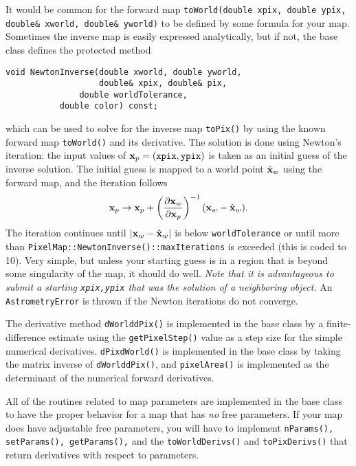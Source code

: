 \documentclass[11pt,preprint,flushrt]{aastex}
\begin{document}
It would be common for the forward map {\tt toWorld(double xpix, double ypix, double\& xworld, double\& yworld)} to be defined by some formula for your map.  Sometimes the inverse map is easily expressed analytically, but if not, the base class defines the protected method
\begin{verbatim}
void NewtonInverse(double xworld, double yworld, 
                   double& xpix, double& pix,
  	           double worldTolerance,
		   double color) const;
\end{verbatim}
which can be used to solve for the inverse map {\tt toPix()} by using the known forward map {\tt toWorld()} and its derivative.  The solution is done using Newton's iteration: the input values of ${\bf x}_p={\tt (xpix,ypix)}$ is taken as an initial guess of the inverse solution.  The initial guess is mapped to a world point $\hat {\bf x}_w$ using the forward map, and the iteration follows
\begin{equation}
{\bf x}_p \rightarrow {\bf x}_p + \left( \frac{\partial {\bf x}_w}{\partial {\bf x}_p}\right)^{-1} ({\bf x}_w - \hat{\bf x}_w).
\end{equation}
The iteration continues until $|{\bf x}_w - \hat{\bf x}_w|$ is below {\tt worldTolerance} or until more than {\tt PixelMap::NewtonInverse()::maxIterations} is exceeded (this is coded to 10).  Very simple, but unless your starting guess is in a region that is beyond some singularity of the map, it should do well.  {\em Note that it is advantageous to submit a starting {\tt xpix,ypix} that was the solution of a neighboring object.}  An {\tt AstrometryError} is thrown if the Newton iterations do not converge.

The derivative method {\tt dWorlddPix()} is implemented in the base class by a finite-difference estimate using the {\tt getPixelStep()} value as a step size for the simple numerical derivatives.  {\tt dPixdWorld()} is implemented in the base class by taking the matrix inverse of {\tt dWorlddPix()},  and {\tt pixelArea()} is implemented as the determinant of the numerical forward derivatives.

All of the routines related to map parameters are implemented in the base class to have the proper behavior for a map that has {\em no} free parameters.  If your map does have adjustable free parameters, you will have to implement {\tt nParams(), setParams(), getParams(),} and the {\tt toWorldDerivs()} and {\tt toPixDerivs()} that return derivatives with respect to parameters.
\end{document}
